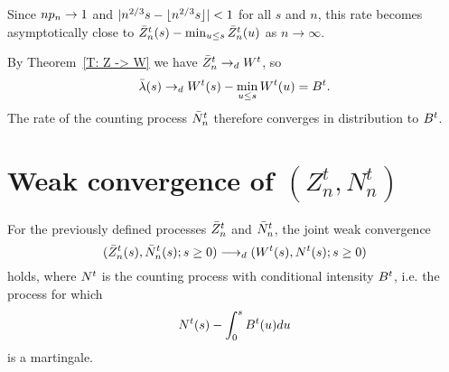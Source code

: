 Since $np_n \rightarrow 1$ and $|n^{2 / 3}s - \lfloor n^{2 / 3}s\rfloor| < 1$ for all $s$ and $n$,
this rate becomes asymptotically close to $\bar{Z}^t_n(s) - \min_{u \leq s}\bar{Z}^t_n(u)$ as $n \rightarrow \infty$.

By Theorem~\ref{T: Z -> W} we have $\bar{Z}^t_n \rightarrow_d W^t$,
so
\begin{equation}
\bar{\lambda}(s) \rightarrow_d W^t(s) - \min_{u \leq s}W^t(u) = B^t.
\end{equation}
The rate of the counting process $\bar{N}_n^t$ therefore converges in distribution to $B^t$.




\section{Weak convergence of $(Z^t_n, N^t_n)$}


\begin{theorem} \label{T: Joint Convergence}
	For the previously defined processes $\bar{Z}^t_n$ and $\bar{N}_n^t$,
	the joint weak convergence
	\begin{equation}
	( \bar{Z}^t_n(s), \bar{N}_n^t(s); s \geq 0 ) \longrightarrow_d (W^t(s), N^t(s); s \geq 0)
	\end{equation}
	holds, where $N^t$ is the counting process with conditional intensity $B^t$,
	i.e. the process for which
	\begin{equation*}
	N^t(s) - \int_{0}^s B^t(u)du
	\end{equation*}
	is a martingale.
\end{theorem}

